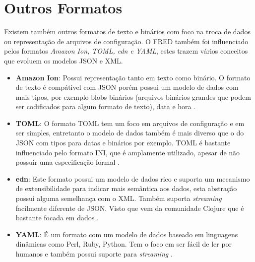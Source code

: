 \section{Outros Formatos}

Existem também outros formatos de texto e binários com foco na troca de dados
ou representação de arquivos de configuração. O FRED também foi influenciado 
pelos formatos \textit{Amazon Ion, TOML, edn e YAML}, estes trazem vários conceitos 
que evoluem os modelos JSON e XML.

\begin{itemize}
    \item \textbf{Amazon Ion}: Possui representação tanto em texto como binário. O formato de texto
    é compátivel com JSON porém possui um modelo de dados com mais tipos, por exemplo blobs binários (arquivos
    binários grandes que podem ser codificados para algum formato de texto), data e hora \cite{amznion}.
    \item \textbf{TOML}: O formato TOML tem um foco em arquivos de configuração e em ser simples, 
    entretanto o modelo de dados também é mais diverso que o do JSON com tipos para datas e binários 
    por exemplo. TOML é bastante influenciado pelo formato INI, que é amplamente utilizado, apesar de não
    possuir uma especificação formal \cite{toml}.
    \item \textbf{edn}: Este formato possui um modelo de dados rico e suporta um 
    mecanismo de extensibilidade para indicar mais semântica aos dados, esta abstração possui 
    alguma semelhança com o XML. Também suporta \textit{streaming} facilmente diferente de JSON.
    Visto que vem da comunidade Clojure que é bastante focada em dados \cite{edn}.
    \item \textbf{YAML}: É um formato com um modelo de dados baseado em linguagens dinâmicas
    como Perl, Ruby, Python. Tem o foco em ser fácil de ler por humanos e também possui suporte
    para \textit{streaming} \cite{yaml}.
\end{itemize}